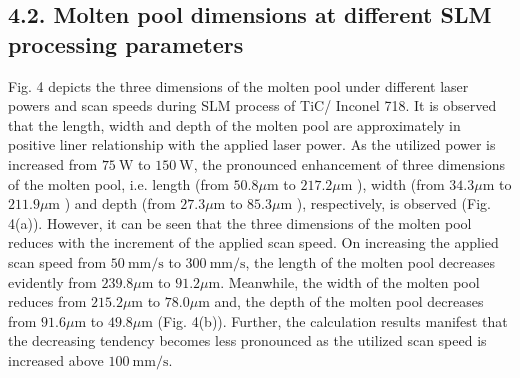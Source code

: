 \documentclass[10pt]{article}
\begin{document}
\subsection*{4.2. Molten pool dimensions at different SLM processing parameters}
Fig. 4 depicts the three dimensions of the molten pool under different laser powers and scan speeds during SLM process of TiC/ Inconel 718. It is observed that the length, width and depth of the molten pool are approximately in positive liner relationship with the applied laser power. As the utilized power is increased from $75 \mathrm{~W}$ to $150 \mathrm{~W}$, the pronounced enhancement of three dimensions of the molten pool, i.e. length (from $50.8 \mu \mathrm{m}$ to $217.2 \mu \mathrm{m}$ ), width (from $34.3 \mu \mathrm{m}$ to $211.9 \mu \mathrm{m}$ ) and depth (from $27.3 \mu \mathrm{m}$ to $85.3 \mu \mathrm{m}$ ), respectively, is observed (Fig. 4(a)). However, it can be seen that the three dimensions of the molten pool reduces with the increment of the applied scan speed. On increasing the applied scan speed from $50 \mathrm{~mm} / \mathrm{s}$ to $300 \mathrm{~mm} / \mathrm{s}$, the length of the molten pool decreases evidently from $239.8 \mu \mathrm{m}$ to $91.2 \mu \mathrm{m}$. Meanwhile, the width of the molten pool reduces from $215.2 \mu \mathrm{m}$ to $78.0 \mu \mathrm{m}$ and, the depth of the molten pool decreases from $91.6 \mu \mathrm{m}$ to $49.8 \mu \mathrm{m}$ (Fig. 4(b)). Further, the calculation results manifest that the decreasing tendency becomes less pronounced as the utilized scan speed is increased above $100 \mathrm{~mm} / \mathrm{s}$.
\end{document}
